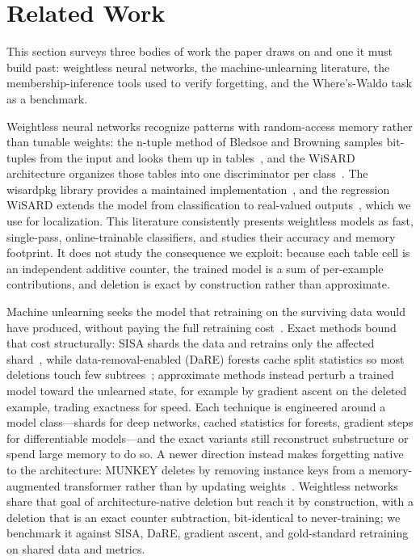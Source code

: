 \section{Related Work}
\label{sec:related}

This section surveys three bodies of work the paper draws on and one it must build past: weightless neural networks, the machine-unlearning literature, the membership-inference tools used to verify forgetting, and the Where's-Waldo task as a benchmark.

Weightless neural networks recognize patterns with random-access memory rather than tunable weights: the n-tuple method of Bledsoe and Browning samples bit-tuples from the input and looks them up in tables~\cite{bledsoe1959ntuple}, and the WiSARD architecture organizes those tables into one discriminator per class~\cite{aleksander1984wisard}. The wisardpkg library provides a maintained implementation~\cite{carvalho2020wisardpkg}, and the regression WiSARD extends the model from classification to real-valued outputs~\cite{lusquino2020rew}, which we use for localization. This literature consistently presents weightless models as fast, single-pass, online-trainable classifiers, and studies their accuracy and memory footprint. It does not study the consequence we exploit: because each table cell is an independent additive counter, the trained model is a sum of per-example contributions, and deletion is exact by construction rather than approximate.

Machine unlearning seeks the model that retraining on the surviving data would have produced, without paying the full retraining cost~\cite{caoyang2015,nguyen2022survey,xu2023survey}. Exact methods bound that cost structurally: SISA shards the data and retrains only the affected shard~\cite{bourtoule2021sisa}, while data-removal-enabled (DaRE) forests cache split statistics so most deletions touch few subtrees~\cite{brophy2021dare}; approximate methods instead perturb a trained model toward the unlearned state, for example by gradient ascent on the deleted example, trading exactness for speed. Each technique is engineered around a model class---shards for deep networks, cached statistics for forests, gradient steps for differentiable models---and the exact variants still reconstruct substructure or spend large memory to do so. A newer direction instead makes forgetting native to the architecture: MUNKEY deletes by removing instance keys from a memory-augmented transformer rather than by updating weights~\cite{laguna2026munkey}. Weightless networks share that goal of architecture-native deletion but reach it by construction, with a deletion that is an exact counter subtraction, bit-identical to never-training; we benchmark it against SISA, DaRE, gradient ascent, and gold-standard retraining on shared data and metrics.

